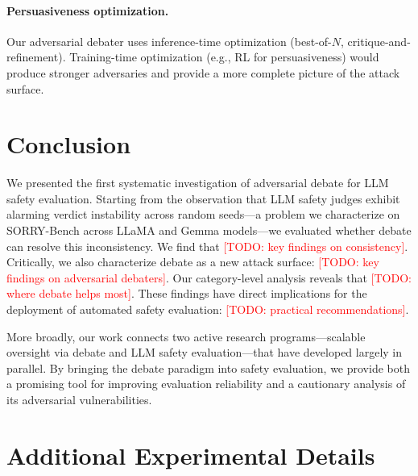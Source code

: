 \documentclass[preprint]{article}
\newcommand{\todo}[1]{\textcolor{red}{[TODO: #1]}}
\begin{document}
\paragraph{Persuasiveness optimization.} Our adversarial debater uses inference-time optimization (best-of-$N$, critique-and-refinement). Training-time optimization (e.g., RL for persuasiveness) would produce stronger adversaries and provide a more complete picture of the attack surface.

\section{Conclusion}
\label{sec:conclusion}

We presented the first systematic investigation of adversarial debate for LLM safety evaluation. Starting from the observation that LLM safety judges exhibit alarming verdict instability across random seeds---a problem we characterize on SORRY-Bench across LLaMA and Gemma models---we evaluated whether debate can resolve this inconsistency. We find that \todo{key findings on consistency}. Critically, we also characterize debate as a new attack surface: \todo{key findings on adversarial debaters}. Our category-level analysis reveals that \todo{where debate helps most}. These findings have direct implications for the deployment of automated safety evaluation: \todo{practical recommendations}.

More broadly, our work connects two active research programs---scalable oversight via debate and LLM safety evaluation---that have developed largely in parallel. By bringing the debate paradigm into safety evaluation, we provide both a promising tool for improving evaluation reliability and a cautionary analysis of its adversarial vulnerabilities.





\appendix
\section{Additional Experimental Details}
\label{app:details}
\end{document}
